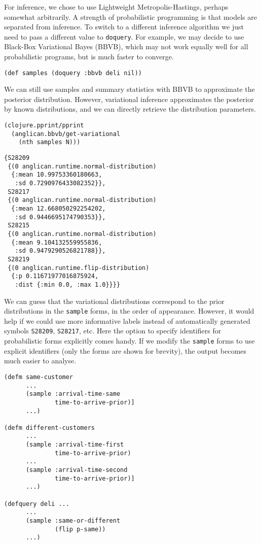 For inference, we chose to use  Lightweight
Metropolis-Hastings, perhaps somewhat arbitrarily. A strength of
probabilistic programming is that models are separated from
inference. To switch to a different inference algorithm we just
need to pass a different value to \texttt{doquery}. For example,
we may decide to use Black-Box Variational Bayes (BBVB), which
may not work equally well for all probabilistic programs, but is
much faster to converge.

\begin{lstlisting}[style=default]
(def samples (doquery :bbvb deli nil))
\end{lstlisting}

We can still use samples and summary statistics with BBVB to
approximate the posterior distribution. However, variational
inference approximates the posterior by known distributions,
and we can directly retrieve the distribution parameters.

\begin{lstlisting}[style=default]
(clojure.pprint/pprint
  (anglican.bbvb/get-variational 
    (nth samples N)))
\end{lstlisting}

\begin{lstlisting}[style=default]
{S28209
 {(0 anglican.runtime.normal-distribution)
  {:mean 10.99753360180663,
   :sd 0.7290976433082352}},
 S28217
 {(0 anglican.runtime.normal-distribution)
  {:mean 12.668050292254202,
   :sd 0.9446695174790353}},
 S28215
 {(0 anglican.runtime.normal-distribution)
  {:mean 9.104132559955836,
   :sd 0.9479290526821788}},
 S28219
 {(0 anglican.runtime.flip-distribution)
  {:p 0.11671977016875924,
   :dist {:min 0.0, :max 1.0}}}}
\end{lstlisting}

We can guess that the variational distributions correspond to the
prior distributions in the \texttt{sample} forms, in the order
of appearance. However, it would help if we could use more
informative labels instead of automatically generated symbols
\texttt{S28209}, \texttt{S28217}, etc. Here the option to
specify identifiers for probabilistic forms explicitly comes
handy. If we modify the \texttt{sample} forms to use explicit identifiers
(only the forms are shown for brevity), the output becomes much
easier to analyse.

\begin{lstlisting}[style=default]
(defm same-customer 
      ...
      (sample :arrival-time-same
              time-to-arrive-prior)]
      ...)

(defm different-customers
      ... 
      (sample :arrival-time-first
              time-to-arrive-prior)
      ...
      (sample :arrival-time-second
              time-to-arrive-prior)]
      ...)

(defquery deli ...
      ...
      (sample :same-or-different
              (flip p-same))
      ...)
\end{lstlisting}

